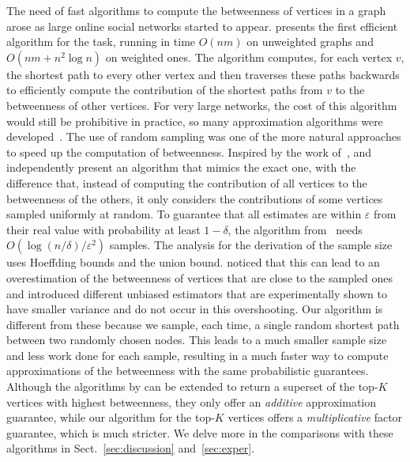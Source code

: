 The need of fast algorithms to compute the betweenness of vertices in a graph
arose as large online social networks started to appear. \citet{Brandes01} presents the
first efficient algorithm for the task, running in time $O(nm)$ on
unweighted graphs and $O(nm+n^2\log n)$ on weighted ones. The
algorithm computes, for each vertex $v$, the shortest path to every other vertex
and then traverses these paths backwards to efficiently compute the contribution
of the shortest paths from $v$ to the betweenness of other vertices. For very
large networks, the cost of this algorithm would still be prohibitive in
practice, so many approximation algorithms were
developed~\citep{JacobKLPT05,BrandesP07,BaderKMM07,GeisbergerSS08,MaiyaBW10,LimMRTB11}.
The use of random sampling was one of the more natural approaches to speed up
the computation of betweenness. Inspired by the work of~\citet{EppsteinW04},
\citet{JacobKLPT05} and independently \citet{BrandesP07} present an algorithm
that mimics the exact one, with the difference that,
instead of computing the contribution of all vertices to the betweenness of the
others, it only considers the contributions of some vertices sampled uniformly
at random. To guarantee that all estimates are within $\varepsilon$ from their
real value with probability at least $1-\delta$, the algorithm
from~\citep{JacobKLPT05,BrandesP07} needs $O(\log(n/\delta)/\varepsilon^2)$
samples. The analysis for the derivation of the sample size uses Hoeffding bounds %
and the union bound. %
\citet{GeisbergerSS08} noticed that this can lead
to an overestimation of the betweenness of vertices that are close to the
sampled ones and introduced different unbiased estimators that are
experimentally shown to have smaller variance and do not occur in this
overshooting. Our algorithm is different from these because we sample, each
time, a single random shortest path between two randomly chosen nodes. This
leads to a much smaller sample size and less work done for each sample,
resulting in a much faster way to compute approximations of the betweenness with
the same probabilistic guarantees. 
\ifproof
Although the algorithms by
\citep{BrandesP07,JacobKLPT05,GeisbergerSS08} can be extended to return a
superset of the top-$K$ vertices with highest betweenness, they only offer an
\emph{additive} approximation guarantee, while our algorithm for the top-$K$
vertices offers a \emph{multiplicative} factor guarantee, which is much
stricter. 
\fi
We delve more in the comparisons with these algorithms in
Sect.~\ref{sec:discussion} and~\ref{sec:exper}. 

